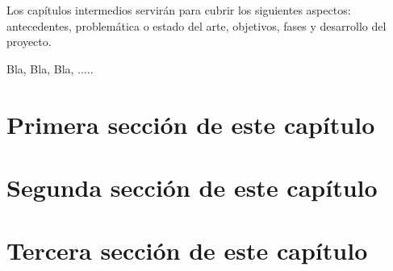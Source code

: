 


Los capítulos intermedios servirán para cubrir los siguientes aspectos:
antecedentes, problemática o estado del arte, objetivos, fases y desarrollo del proyecto.

Bla, Bla, Bla, .....

\section{Primera sección de este capítulo}
\label{3:sec1}

\section{Segunda sección de este capítulo}
\label{3:sec2}

\section{Tercera sección de este capítulo}
\label{:sec3}
